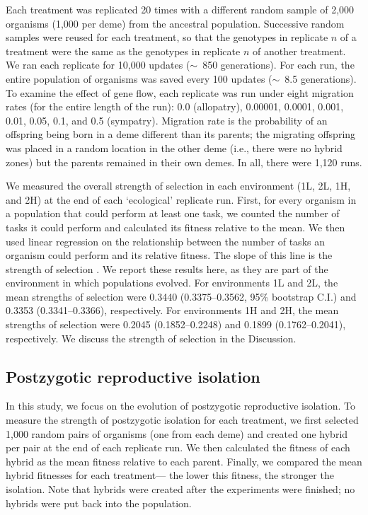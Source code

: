 \begin{doublespace}
Each treatment was replicated 20 times
with a different random sample of 2,000 organisms (1,000 per deme)
from the ancestral population.
%
Successive random samples were reused for each treatment,
so that the genotypes in replicate $n$ of a treatment
were the same as the genotypes in replicate $n$ of another treatment.
%
We ran each replicate for 10,000 updates ($\sim$~850 generations).
%
For each run, the entire population of organisms
was saved every 100 updates ($\sim$~8.5 generations).
%
To examine the effect of gene flow,
each replicate was run under eight migration rates
(for the entire length of the run):
0.0 (allopatry), 0.00001, 0.0001, 0.001, 0.01, 0.05, 0.1, and 0.5 (sympatry).
%
Migration rate is the probability of an offspring
being born in a deme different than its parents;
the migrating offspring was placed in a random
location in the other deme (i.e., there were no hybrid zones)
but the parents remained in their own demes.
%
In all, there were 1,120 runs.



We measured the overall strength of selection in each environment
(1L, 2L, 1H, and 2H) at the end of each `ecological' replicate run.
%
First, for every organism in a population that could perform at least one task,
we counted the number of tasks it could perform
and calculated its fitness relative to the mean.
%
We then used linear regression on the relationship between
the number of tasks an organism could perform and its relative fitness.
%
The slope of this line is the strength of selection \citep{con04}.
%
We report these results here, as they are part of the environment
in which populations evolved.
%
For environments 1L and 2L, the mean strengths of selection were
0.3440 (0.3375--0.3562, 95\% bootstrap C.I.) and 0.3353 (0.3341--0.3366),
respectively.
%
For environments 1H and 2H, the mean strengths of selection were
0.2045 (0.1852--0.2248) and 0.1899 (0.1762--0.2041), respectively.
%
We discuss the strength of selection in the Discussion.



\subsection{Postzygotic reproductive isolation}

In this study,
we focus on the evolution of postzygotic reproductive isolation.
%
To measure the strength of postzygotic isolation for each treatment,
we first selected 1,000 random pairs of organisms (one from each deme)
and created one hybrid per pair at the end of each replicate run.
%
We then calculated the fitness of each hybrid
as the mean fitness relative to each parent.
%
Finally, we compared the mean hybrid fitnesses for each treatment---%
the lower this fitness, the stronger the isolation.
%
Note that hybrids were created
after the experiments were finished;
no hybrids were put back into the population.




\end{doublespace}
